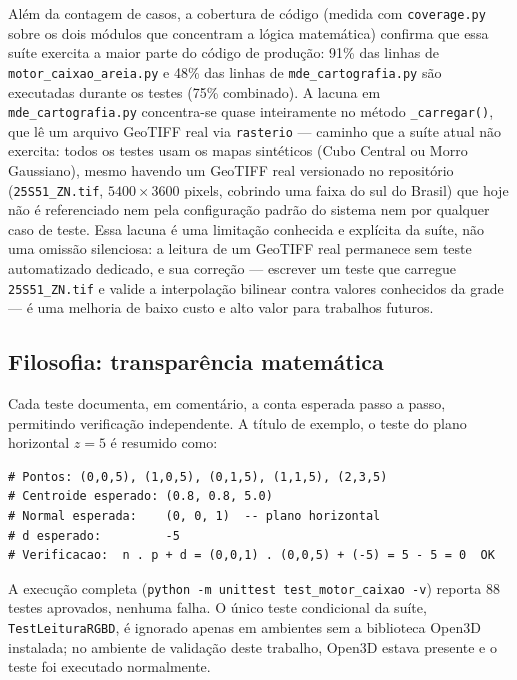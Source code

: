 \noindent Além da contagem de casos, a cobertura de código
(medida com \texttt{coverage.py} sobre os dois módulos que concentram
a lógica matemática) confirma que essa suíte exercita a maior parte do
código de produção: 91\% das linhas de
\texttt{motor\_caixao\_areia.py} e 48\% das linhas de
\texttt{mde\_cartografia.py} são executadas durante os testes
(75\% combinado). A lacuna em \texttt{mde\_cartografia.py}
concentra-se quase inteiramente no método \texttt{\_carregar()}, que lê
um arquivo GeoTIFF real via \texttt{rasterio} — caminho que a suíte
atual não exercita: todos os testes usam os mapas sintéticos (Cubo
Central ou Morro Gaussiano), mesmo havendo um GeoTIFF real versionado
no repositório (\texttt{25S51\_ZN.tif}, $5400 \times 3600$ pixels,
cobrindo uma faixa do sul do Brasil) que hoje não é referenciado nem
pela configuração padrão do sistema nem por qualquer caso de teste.
Essa lacuna é uma limitação conhecida e explícita da suíte, não uma
omissão silenciosa: a leitura de um GeoTIFF real permanece sem teste
automatizado dedicado, e sua correção — escrever um teste que carregue
\texttt{25S51\_ZN.tif} e valide a interpolação bilinear contra valores
conhecidos da grade — é uma melhoria de baixo custo e alto valor para
trabalhos futuros.

\subsection{Filosofia: transparência matemática}

Cada teste documenta, em comentário, a conta esperada passo a passo,
permitindo verificação independente. A título de exemplo, o teste
do plano horizontal $z = 5$ é resumido como:

\begin{lstlisting}[caption={Teste do plano horizontal — verificação manual.}, label=lst:test-plano]
# Pontos: (0,0,5), (1,0,5), (0,1,5), (1,1,5), (2,3,5)
# Centroide esperado: (0.8, 0.8, 5.0)
# Normal esperada:    (0, 0, 1)  -- plano horizontal
# d esperado:         -5
# Verificacao:  n . p + d = (0,0,1) . (0,0,5) + (-5) = 5 - 5 = 0  OK
\end{lstlisting}

A execução completa (\texttt{python -m unittest test\_motor\_caixao -v})
reporta 88 testes aprovados, nenhuma falha. O único teste
condicional da suíte, \texttt{TestLeituraRGBD}, é ignorado apenas em
ambientes sem a biblioteca Open3D instalada; no ambiente de validação
deste trabalho, Open3D estava presente e o teste foi executado
normalmente.

